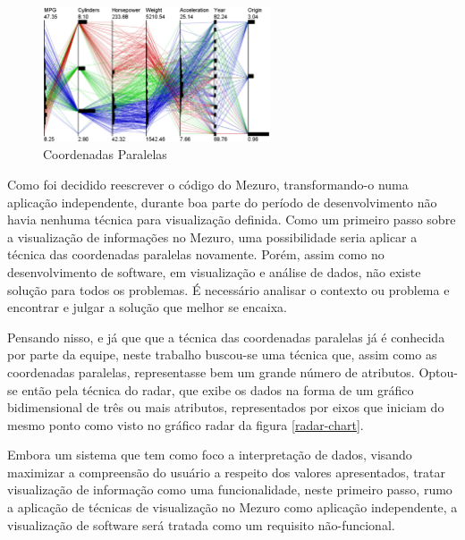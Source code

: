 \graphicspath{{figuras/}}
\begin{figure}[h]
\centering
\includegraphics[width=0.6\textwidth]{parallel_coordinate}
\caption{Coordenadas Paralelas \cite{mcdonnell2008illustrative}}
\label{parallel-coordinate}
\end{figure}

Como foi decidido reescrever o código do Mezuro, transformando-o numa aplicação independente, durante boa parte do período de desenvolvimento não havia nenhuma técnica para visualização definida. Como um primeiro passo sobre a visualização de informações no Mezuro, uma possibilidade seria aplicar a técnica das coordenadas paralelas novamente. Porém, assim como no desenvolvimento de software, em visualização e análise de dados, não existe solução para todos os problemas. É necessário analisar o contexto ou problema e encontrar e julgar a solução que melhor se encaixa.

Pensando nisso, e já que que a técnica das coordenadas paralelas já é conhecida por parte da equipe, neste trabalho buscou-se uma técnica que, assim como as coordenadas paralelas, representasse bem um grande número de atributos. Optou-se então pela técnica do radar, que exibe os dados na forma de um gráfico bidimensional de três ou mais atributos, representados por eixos que iniciam do mesmo ponto como visto no gráfico radar da figura \ref{radar-chart}.

Embora um sistema que tem como foco a interpretação de dados, visando maximizar a compreensão do usuário a respeito dos valores apresentados, tratar visualização de informação como uma funcionalidade, neste primeiro passo, rumo a aplicação de técnicas de visualização no Mezuro como aplicação independente, a visualização de software será tratada como um requisito não-funcional. 

